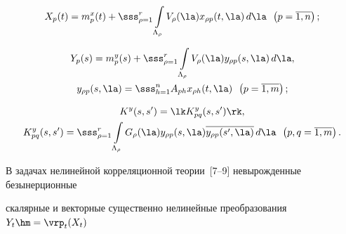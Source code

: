      \begin{equation*}

     X_p(t) = m_p^x(t) + \sss_{\rho=1}^r \int\limits_{\Lambda_\rho} V_\rho (\la) 

x_{\rho p}(t,\la) \,d\la\enskip \left(p=\overline{1,n}\right); %

\end{equation*}



\vspace*{-14pt}



\noindent

\begin{multline*}

   Y_p(s) = m_p^y(s) + \sss_{\rho=1}^r \int\limits_{\Lambda_\rho} V_\rho (\la) 

y_{\rho p}(s,\la)\, d\la, %

\\

 y_{\rho p}(s,\la) = \sss_{h=1}^n  A_{ph} x_{\rho h} (t,\la)\enskip 

\left(p=\overline{1,m}\right); %

\end{multline*}



\vspace*{-14pt}



\noindent

 \begin{multline*}

     K^y (s,s') =\lk K_{pq}^y (s,s')\rk,\\

     K_{pq}^y (s,s') = \displaystyle\sss_{\rho=1}^r \int\limits_{\Lambda_\rho} G_\rho (\la) 

y_{\rho p}(s,\la) \overline{y_{\rho p}(s',\la)}\,d\la\enskip \left(p,q=\overline{1,m}\right).


      \end{multline*}

      

      \vspace*{-6pt}



В задачах нелинейной корреляционной теории~[7--9] невырожденные безынер\-ци\-он\-ные 

скалярные и векторные существенно нелинейные преобразования $Y_t \hm=\vrp_t(X_t)$ 

